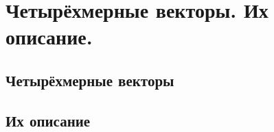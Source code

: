\chapter{Четырёхмерные векторы. Их описание.}

\section{Четырёхмерные векторы}
\section{Их описание}
